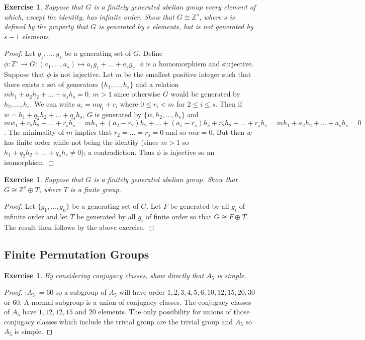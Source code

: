 \documentclass{article}
\newtheorem{exercise}[theorem]{Exercise}
\begin{document}
\begin{exercise}
Suppose that $G$ is a finitely generated abelian group every element of which, except the identity, has infinite order. Show that $G\cong\mathbb{Z}^s$, where $s$ is defined by the property that $G$ is generated by $s$ elements, but is not generated by $s-1$ elements.
\end{exercise}
\begin{proof}
Let $g_1,...,g_s$ be a generating set of $G$. Define $\phi:\mathbb{Z}^s\to G:(a_1,...,a_s)\mapsto a_1g_1+...+a_sg_s$. $\phi$ is a homomorphism and surjective. Suppose that $\phi$ is not injective. Let $m$ be the smallest positive integer such that there exists a set of generators $\{h_1,...,h_s\}$ and a relation $mh_1+a_2h_2+...+a_sh_s=0$. $m>1$ since otherwise $G$ would be generated by $h_2,...,h_s$. We can write $a_i=mq_i+r_i$ where $0\leq r_i<m$ for $2\leq i \leq s$. Then if $w=h_1+q_2h_2+...+q_sh_s$, $G$ is generated by $\{w,h_2,...,h_s\}$ and $mw_1+r_2h_2+...+r_sh_s=mh_1+(a_2-r_2)h_2+...+(a_s-r_s)h_s+r_2h_2+...+r_sh_s=mh_1+a_2h_2+...+a_sh_s=0$. The minimality of $m$ implies that $r_2=...=r_s=0$ and so $mw=0$. But then $w$ has finite order while not being the identity (since $m>1$ so $h_1+q_2h_2+...+q_sh_s\neq0$); a contradiction. Thus $\phi$ is injective so an isomorphism.
\end{proof}

\begin{exercise}
Suppose that $G$ is a finitely generated abelian group. Show that $G\cong \mathbb{Z}^s\oplus T$, where $T$ is a finite group.
\end{exercise}
\begin{proof}
Let $\{g_1,...,g_n\}$ be a generating set of $G$. Let $F$ be generated by all $g_i$ of infinite order and let $T$ be generated by all $g_i$ of finite order so that $G\cong F\oplus T$. The result then follows by the above exercise.
\end{proof}

\subsection{Finite Permutation Groups}
\begin{exercise}
By considering conjugacy classes, show directly that $A_5$ is simple.
\end{exercise}
\begin{proof}
$|A_5|=60$ so a subgroup of $A_5$ will have order $1,2,3,4,5,6,10,12,15,20,30$ or $60$. A normal subgroup is a union of conjugacy classes. The conjugacy classes of $A_5$ have $1,12,12,15$ and $20$ elements. The only possibility for unions of those conjugacy classes which include the trivial group are the trivial group and $A_5$ so $A_5$ is simple. 
\end{proof}
\end{document}
